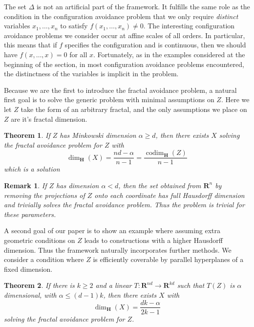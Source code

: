 \documentclass{article}
\theoremstyle{plain}
\theoremstyle{plain}
\newtheorem{theorem}{Theorem}
\newtheorem*{remark}{Remark}
\DeclareMathOperator{\codim}{codim}
\begin{document}
\begin{multicols}{2}
The set $\Delta$ is not an artificial part of the framework. It fulfills the same role as the condition in the configuration avoidance problem that we only require {\it distinct} variables $x_1, \dots, x_n$ to satisfy $f(x_1, \dots, x_n) \neq 0$. The interesting configuration avoidance problems we consider occur at affine scales of all orders. In particular, this means that if $f$ specifies the configuration and is continuous, then we should have $f(x,\dots,x) = 0$ for all $x$. Fortunately, as in the examples considered at the beginning of the section, in most configuration avoidance problems encountered, the distinctness of the variables is implicit in the problem.

Because we are the first to introduce the fractal avoidance problem, a natural first goal is to solve the generic problem with minimal assumptions on $Z$. Here we let $Z$ take the form of an arbitrary fractal, and the only assumptions we place on $Z$ are it's fractal dimension.

\begin{theorem}
	If $Z$ has Minkowski dimension $\alpha \geq d$, then there exists $X$ solving the fractal avoidance problem for $Z$ with
	\[ \dim_{\mathbf{H}}(X) = \frac{nd - \alpha}{n - 1} = \frac{\codim_{\mathbf{H}}(Z)}{n - 1} \]
	which is a solution 
\end{theorem}

\begin{remark}
	If $Z$ has dimension $\alpha < d$, then the set obtained from $\mathbf{R}^n$ by removing the projections of $Z$ onto each coordinate has full Hausdorff dimension and trivially solves the fractal avoidance problem. Thus the problem is trivial for these parameters.
\end{remark}

A second goal of our paper is to show an example where assuming extra geometric conditions on $Z$ leads to constructions with a higher Hausdorff dimension. Thus the framework naturally incorporates further methods. We consider a condition where $Z$ is efficiently coverable by parallel hyperplanes of a fixed dimension.

\begin{theorem}
	If there is $k \geq 2$ and a linear $T: \mathbf{R}^{nd} \to \mathbf{R}^{kd}$ such that $T(Z)$ is $\alpha$ dimensional, with $\alpha \leq (d-1)k$, then there exists $X$ with
	\[ \dim_{\mathbf{H}}(X) = \frac{dk - \alpha}{2k-1} \]
	solving the fractal avoidance problem for $Z$.
\end{theorem}


\end{multicols}
\end{document}
